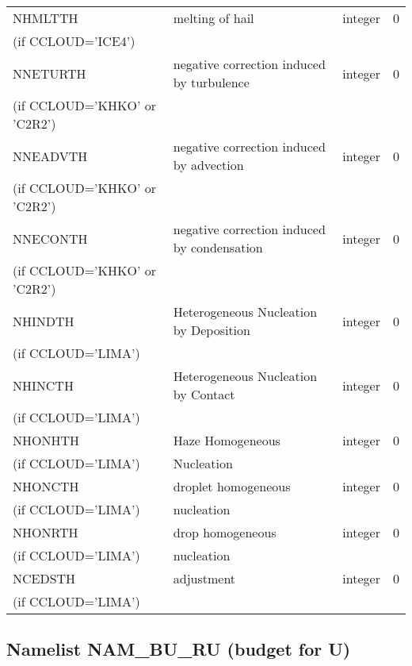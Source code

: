 \begin{center}
\begin{tabular} {|p{8cm}|p{4cm}|>{\centering}p{1.5cm}|p{1.5cm}<{\centering}|}
NHMLTTH   & melting of hail      & integer  &  0 \index{NHMLTTH!\innam{NAM\_BU\_RTH}}\\
(if CCLOUD='ICE4')   &   &       &   \\\hline
 NNETURTH  &  negative correction induced by turbulence     & integer  &  0 \index{NNETURTH!\innam{NAM\_BU\_RTH}}\\
(if CCLOUD='KHKO' or 'C2R2')   &   &       &   \\\hline
 NNEADVTH  & negative correction induced by advection      & integer  &  0 \index{NNEADVTH!\innam{NAM\_BU\_RTH}}\\
(if CCLOUD='KHKO' or 'C2R2')   &   &       &   \\\hline
 NNECONTH  & negative correction induced by condensation      & integer  &  0 \index{NNECONTH!\innam{NAM\_BU\_RTH}}\\
(if CCLOUD='KHKO' or 'C2R2')   &   &       &   \\\hline
NHINDTH   & Heterogeneous Nucleation by Deposition      & integer  &  0 \index{NHINDTH!\innam{NAM\_BU\_RTH}}\\
(if CCLOUD='LIMA')   &   &       &   \\\hline
NHINCTH   & Heterogeneous Nucleation by Contact      & integer  &  0 \index{NHINCTH!\innam{NAM\_BU\_RTH}}\\
(if CCLOUD='LIMA')   &   &       &   \\\hline
NHONHTH   & Haze Homogeneous       & integer  &  0 \index{NHONHTH!\innam{NAM\_BU\_RTH}}\\
(if CCLOUD='LIMA')   &   Nucleation&       &   \\\hline
NHONCTH   &  droplet homogeneous      & integer  &  0 \index{NHONCTH!\innam{NAM\_BU\_RTH}}\\
(if CCLOUD='LIMA')   &nucleation   &       &   \\\hline
NHONRTH   & drop homogeneous       & integer  &  0 \index{NHONRTH!\innam{NAM\_BU\_RTH}}\\
(if CCLOUD='LIMA')   & nucleation  &       &   \\\hline
NCEDSTH   & adjustment      & integer  &  0 \index{NCEDSTH!\innam{NAM\_BU\_RTH}}\\
(if CCLOUD='LIMA')   &   &       &   \\\hline

\end{tabular}
\end{center}
\subsection{Namelist NAM\_BU\_RU (budget for U)}

